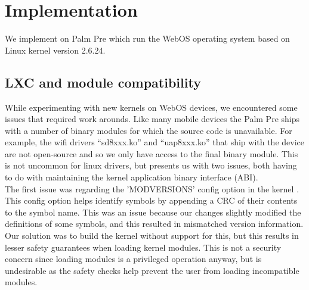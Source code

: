 \section{Implementation}
\label{sec:impl}

We implement \emph{\proj} on Palm Pre which run the WebOS operating system based on Linux kernel version 2.6.24.

\subsection{LXC and module compatibility}
While experimenting with new kernels on WebOS devices, we encountered some issues that required work arounds.  Like many mobile devices the Palm Pre ships with a number of binary modules for which the source code is unavailable.  For example, the wifi drivers ``sd8xxx.ko'' and ``uap8xxx.ko'' that ship with the device are not open-source and so we only have access to the final binary module.  This is not uncommon for linux drivers, but presents us with two issues, both having to do with maintaining the kernel application binary interface (ABI). \\

    The first issue was regarding the 'MODVERSIONS' config option in the kernel \cite{modversions}.  This config option helps identify symbols by appending a CRC of their contents to the symbol name.  This was an issue because our changes slightly modified the definitions of some symbols, and this resulted in mismatched version information.  Our solution was to build the kernel without support for this, but this results in lesser safety guarantees when loading kernel modules.  This is not a security concern since loading modules is a privileged operation anyway, but is undesirable as the safety checks help prevent the user from loading incompatible modules. \\

